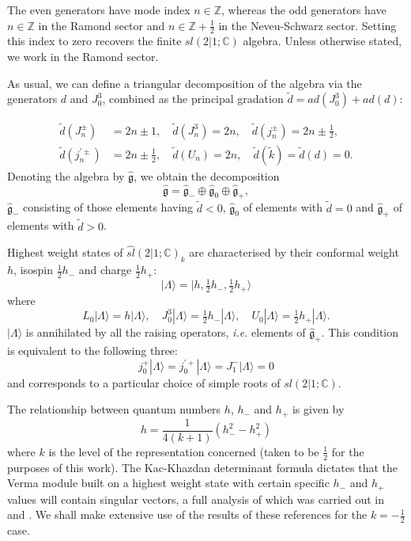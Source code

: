 \documentclass[a4paper,12pt]{article}
\def\t           {\tilde}
\def\g           {\mathfrak{g}}
\def\Z           {\mathbb Z}
\def\fsl         {sl(2|1;\mathbb C)}
\def\hslck       {\hat{sl}(2|1;{\mathbb C})_k}
\def\hf          {\tfrac{1}{2}}
\begin{document}
The even generators have mode index $n \in \Z$, whereas the odd
generators have $n \in \Z$ in the Ramond sector and $n \in \Z+\hf$ in
the Neveu-Schwarz sector.  Setting this index to zero recovers the
finite $\fsl$ algebra.  Unless otherwise stated, we work in the
Ramond sector.

As usual, we can define a triangular decomposition of the algebra via
the generators $d$ and $J_0^3$, combined as the principal gradation
$\t{d}=ad(J_0^3)+ad(d)$:

\begin{align}
\t{d}(J_n^{\pm})&=2n \pm 1, \quad \t{d}(J_n^3)=2n, \quad
\t{d}(j^{\pm}_n)=2n \pm \hf,\\
\t{d}(j^{' \pm}_n)&=2n \pm \hf, \quad \t{d}(U_n)=2n, \quad
\t{d}(\t{k})=\t{d}(d)=0.
\end{align}
Denoting the algebra by $\hat{\g}$, we obtain the decomposition 
\begin{equation}
\hat{\g}=\hat{\g}_- \oplus \hat{\g}_0 \oplus \hat{\g}_+,
\end{equation}
$\hat{\g}_-$ consisting of those elements having $\t{d}<0$,
$\hat{\g}_0$ of elements with $\t{d}=0$ and $\hat{\g}_+$ of
elements with $\t{d}>0$.

Highest weight states  of $\hslck$ are characterised by their
conformal weight $h$, isospin $\hf h_-$ and charge $\hf h_+$:
\begin{equation}
|\Lambda \rangle=|h, \hf h_-, \hf h_+ \rangle 
\end{equation}
where
\begin{equation}
L_0|\Lambda \rangle=h|\Lambda \rangle, \quad J^3_0|\Lambda \rangle=\hf
h_-|\Lambda \rangle, \quad U_0|\Lambda \rangle=\hf h_+|\Lambda
\rangle.
\end{equation}
$|\Lambda \rangle$ is annihilated by all the raising operators, {\em i.e.}
elements of $\hat{\g}_+$.  This condition is equivalent to the
following three: 
\begin{equation}
j_0^+ |\Lambda \rangle = j_0^{'+} |\Lambda \rangle = J_1^- |\Lambda
\rangle =0
\end{equation}
and corresponds to a particular choice of simple roots of $\fsl$. 

The relationship between quantum numbers $h$, $h_-$ and $h_+$ is given by
\begin{equation}
h=\frac{1}{4(k+1)}(h_-^2-h_+^2)
\end{equation}
where $k$ is the level of the representation concerned (taken to be
$\hf$ for the purposes of this work).  The Kac-Khazdan determinant
formula dictates that the Verma module built on a highest weight state
with certain specific $h_-$ and $h_+$ values will contain singular
vectors, a full analysis of which was carried out in \cite{BT97} and
\cite{BHT98}.  We shall make extensive use of the results of these
references for the $k=-\hf$ case.
\end{document}

